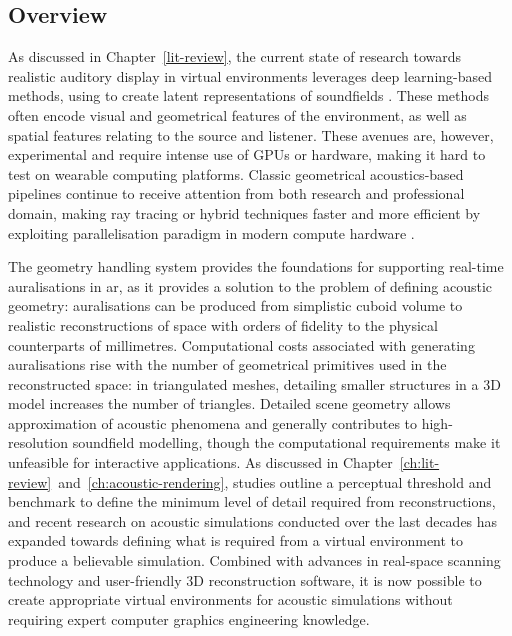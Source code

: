\subsection{Overview}
As discussed in Chapter~\ref{lit-review}, the current state of research towards realistic auditory display in virtual environments leverages deep learning-based methods, using  to create latent representations of soundfields \citep{liu2022sound, ratnarajah2022mesh2ir, chen2023everywhere}. These methods often encode visual and geometrical features of the environment, as well as spatial features relating to the source and listener. These avenues are, however, experimental and require intense use of GPUs or hardware, making it hard to test on wearable computing platforms. Classic geometrical acoustics-based pipelines continue to receive attention from both research and professional domain, making ray tracing or hybrid techniques faster and more efficient by exploiting parallelisation paradigm in modern compute hardware \citep{cowan2010gpu,diaz2021gpurir}.\par
The geometry handling system provides the foundations for supporting real-time auralisations in \acrshort{ar}, as it provides a solution to the problem of defining acoustic geometry: auralisations can be produced from simplistic cuboid volume to realistic reconstructions of space with orders of fidelity to the physical counterparts of millimetres. Computational costs associated with generating auralisations rise with the number of geometrical primitives used in the reconstructed space: in triangulated meshes, detailing smaller structures in a 3D model increases the number of triangles. Detailed scene geometry allows approximation of acoustic phenomena and generally contributes to high-resolution soundfield modelling, though the computational requirements make it unfeasible for interactive applications. As discussed in Chapter~\ref{ch:lit-review}~and~\ref{ch:acoustic-rendering}, studies outline a perceptual threshold and benchmark to define the minimum level of detail required from reconstructions, and recent research on acoustic simulations conducted over the last decades has expanded towards defining what is required from a virtual environment to produce a believable simulation. Combined with advances in real-space scanning technology and user-friendly 3D reconstruction software, it is now possible to create appropriate virtual environments for acoustic simulations without requiring expert computer graphics engineering knowledge.\par

